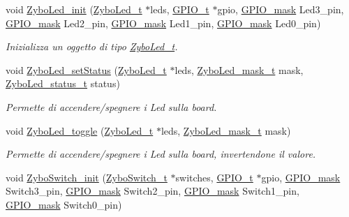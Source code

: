 \begin{DoxyCompactItemize}
void \hyperlink{group___zybo_ga51b030897fde9b6378d083b8d711008e}{Zybo\+Led\+\_\+init} (\hyperlink{struct_zybo_led__t}{Zybo\+Led\+\_\+t} $\ast$leds, \hyperlink{struct_g_p_i_o__t}{G\+P\+I\+O\+\_\+t} $\ast$gpio, \hyperlink{group___g_p_i_o_ga6d5aef8a8a54ee2f602d47252ff66595}{G\+P\+I\+O\+\_\+mask} Led3\+\_\+pin, \hyperlink{group___g_p_i_o_ga6d5aef8a8a54ee2f602d47252ff66595}{G\+P\+I\+O\+\_\+mask} Led2\+\_\+pin, \hyperlink{group___g_p_i_o_ga6d5aef8a8a54ee2f602d47252ff66595}{G\+P\+I\+O\+\_\+mask} Led1\+\_\+pin, \hyperlink{group___g_p_i_o_ga6d5aef8a8a54ee2f602d47252ff66595}{G\+P\+I\+O\+\_\+mask} Led0\+\_\+pin)
\begin{DoxyCompactList}\small\item\em Inizializza un oggetto di tipo \hyperlink{struct_zybo_led__t}{Zybo\+Led\+\_\+t}. \end{DoxyCompactList}\item 
void \hyperlink{group___zybo_gacf5c2b0328c4bdf2d796397fc4510c69}{Zybo\+Led\+\_\+set\+Status} (\hyperlink{struct_zybo_led__t}{Zybo\+Led\+\_\+t} $\ast$leds, \hyperlink{group___zybo_gad11701cccac394f7e1f90de8f85695f3}{Zybo\+Led\+\_\+mask\+\_\+t} mask, \hyperlink{group___zybo_ga3dcb274f22e577705c49944b8d1f4b12}{Zybo\+Led\+\_\+status\+\_\+t} status)
\begin{DoxyCompactList}\small\item\em Permette di accendere/spegnere i Led sulla board. \end{DoxyCompactList}\item 
void \hyperlink{group___zybo_ga20ddd78a98b4c0123c5b964aa0a59046}{Zybo\+Led\+\_\+toggle} (\hyperlink{struct_zybo_led__t}{Zybo\+Led\+\_\+t} $\ast$leds, \hyperlink{group___zybo_gad11701cccac394f7e1f90de8f85695f3}{Zybo\+Led\+\_\+mask\+\_\+t} mask)
\begin{DoxyCompactList}\small\item\em Permette di accendere/spegnere i Led sulla board, invertendone il valore. \end{DoxyCompactList}\item 
void \hyperlink{group___zybo_ga121018c0ccfeb05b6e8f692a5a6955d7}{Zybo\+Switch\+\_\+init} (\hyperlink{struct_zybo_switch__t}{Zybo\+Switch\+\_\+t} $\ast$switches, \hyperlink{struct_g_p_i_o__t}{G\+P\+I\+O\+\_\+t} $\ast$gpio, \hyperlink{group___g_p_i_o_ga6d5aef8a8a54ee2f602d47252ff66595}{G\+P\+I\+O\+\_\+mask} Switch3\+\_\+pin, \hyperlink{group___g_p_i_o_ga6d5aef8a8a54ee2f602d47252ff66595}{G\+P\+I\+O\+\_\+mask} Switch2\+\_\+pin, \hyperlink{group___g_p_i_o_ga6d5aef8a8a54ee2f602d47252ff66595}{G\+P\+I\+O\+\_\+mask} Switch1\+\_\+pin, \hyperlink{group___g_p_i_o_ga6d5aef8a8a54ee2f602d47252ff66595}{G\+P\+I\+O\+\_\+mask} Switch0\+\_\+pin)

\end{DoxyCompactItemize}
